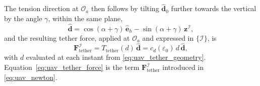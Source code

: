 The tension direction at $\mathcal{O}_a$ then follows by tilting $\hat{\mathbf{d}}_0$ further towards the vertical by the angle $\gamma$, within the same plane,
\begin{equation}
    \hat{\mathbf{d}} = \cos(\alpha+\gamma)\,\hat{\mathbf{e}}_h - \sin(\alpha+\gamma)\,\mathbf{z}^{\mathcal{I}},
    \label{eq:uav_tether_direction}
\end{equation}
and the resulting tether force, applied at $\mathcal{O}_a$ and expressed in $\{\mathcal{I}\}$, is
\begin{equation}
    \mathbf{F}_{\mathrm{tether}}^{\mathcal{I}} = T_{\mathrm{tether}}(d)\,\hat{\mathbf{d}} = c_d(\varepsilon_0)\,d\,\hat{\mathbf{d}},
    \label{eq:uav_tether_force}
\end{equation}
with $d$ evaluated at each instant from \eqref{eq:uav_tether_geometry}. Equation~\eqref{eq:uav_tether_force} is the term $\mathbf{F}_{\mathrm{tether}}^{\mathcal{I}}$ introduced in \eqref{eq:uav_newton}.

